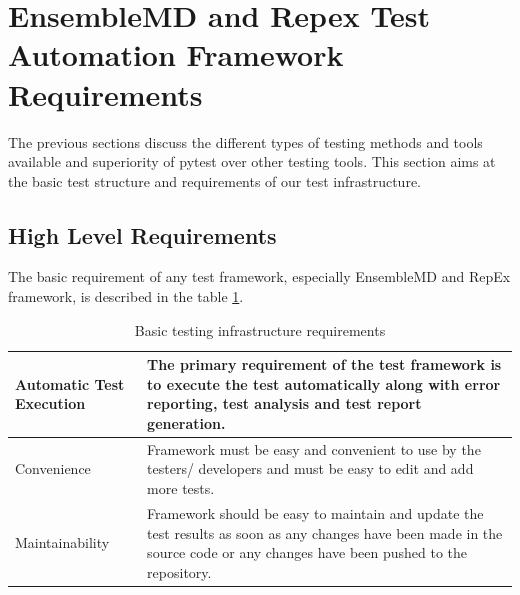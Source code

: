 \documentclass[10pt]{ruthesis}
\begin{document}
\section{EnsembleMD and Repex Test Automation Framework Requirements}
The previous sections discuss the different types of testing methods and tools available and superiority of pytest over other testing tools. This section aims at the basic test structure and requirements of our test infrastructure.

\subsection{High Level Requirements}
The basic requirement of any test framework, especially EnsembleMD and RepEx framework, is described in the table \ref{table1}.

\begin{table}
\begin{center}
\def\arraystretch{2}
\begin{tabular}{|l| p{10cm}|}
\hline
Automatic Test Execution & The primary requirement of the test framework is to execute the test automatically along with error reporting, test analysis and test report generation. \\ 
\hline
Convenience & Framework must be easy and convenient to use by the testers/ developers and must be easy to edit and add more tests. \\ 
\hline
Maintainability & Framework should be easy to maintain and update the test results as soon as any changes have been made in the source code or any changes have been pushed to the repository.\\ 
\hline
\end{tabular}
\end{center}
\caption{Basic testing infrastructure requirements}
\label{table1}
\end{table}
\end{document}
